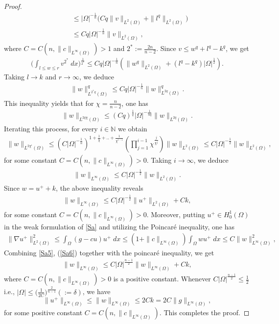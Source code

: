 \documentclass[11pt, notitlepage]{article}
\begin{document}
{\begin{proof}
\begin{align*}
    &\leq |\Omega|^{-\frac{1}{n}}\Big(Cq\|v\|_{L^2(\Omega)}+\|l^q\|_{L^2(\Omega)}\Big)\nonumber\\
    &\leq Cq|\Omega|^{-\frac{1}{n}}\|v\|_{L^2(\Omega)},
\end{align*}
where $C=C(n,\|c\|_{L^\infty(\Omega)})>1$ and $2^*:=\frac{2n}{n-2}$. Since $v\leq w^q+l^q-k^q$, we get
\begin{align*}
    \Big(\int_{l\leq w\leq r}v^{2^*}\;dx\Big)^\frac{1}{2^*}\leq Cq|\Omega|^{-\frac{1}{n}}\left(\|w^q\|_{L^2(\Omega)}+(l^q-k^q)|\Omega|^\frac{1}{2}\right).
\end{align*}
Taking $l\to k$ and $r\to\infty$, we deduce
\begin{align*}
    \|w\|_{L^{2^*q}(\Omega)}^q\leq Cq|\Omega|^{-\frac{1}{n}}\|w\|_{L^{2q}(\Omega)}^q.
\end{align*}
This inequality yields that for $\chi=\frac{n}{n-2}$, one has
\begin{align*}
    \|w\|_{L^{2q\chi}(\Omega)}\leq (Cq)^\frac{1}{q}|\Omega|^{-\frac{1}{nq}}\|w\|_{L^{2q}(\Omega)}.
\end{align*}
 Iterating this process, for every $i\in\mathbb{N}$ we obtain
\begin{align*}
    \|w\|_{L^{2\chi^i}(\Omega)}\leq (C|\Omega|^{-\frac{1}{n}})^{1+\frac{1}{\chi}+..+\frac{1}{\chi^{i-1}}}(\prod_{j=1}^{i-1} \chi^\frac{j}{\chi^j})\|w\|_{L^{2}(\Omega)}\leq C|\Omega|^{-\frac{1}{2}}\|w\|_{L^{2}(\Omega)},
\end{align*}
for some constant $C=C(n,\|c\|_{L^\infty(\Omega)})>0$. Taking $i\to\infty$, we deduce 
\begin{align*}
    \|w\|_{L^\infty(\Omega)}\leq C|\Omega|^{-\frac{1}{2}}\|w\|_{L^{2}(\Omega)}.
\end{align*}
Since $w=u^++k$, the above inequality reveals 
\begin{align}\label{Sa5}
    \|w\|_{L^\infty(\Omega)}\leq C|\Omega|^{-\frac{1}{2}}\|u^+\|_{L^2(\Omega)}+Ck,
\end{align}
for some constant $C=C(n,\|c\|_{L^\infty(\Omega)})>0$.
Moreover, putting $u^+\in H^1_0(\Omega)$ in the weak formulation of \eqref{Sa} and utilizing the Poincar\'{e} inequality, one has
\begin{align}\label{Sa6}
    \|\nabla u^+\|_{L^2(\Omega)}^2\leq \int_\Omega (g-cu)u^+\;dx\leq (1+\|c\|_{L^\infty(\Omega)})\int_\Omega wu^+\;dx\leq C\|w\|_{L^\infty(\Omega)}^2,
\end{align}
Combining \eqref{Sa5}, (\ref{Sa6}) together with the poincar\'{e} inequality, we get
\begin{align}\label{Sa7}
    \|w\|_{L^\infty(\Omega)}\leq C|\Omega|^{\frac{n-1}{2}}\|w\|_{L^\infty(\Omega)}+Ck,
\end{align}
where $C=C(n,\|c\|_{L^\infty(\Omega)})>0$ is a positive constant. Whenever $C|\Omega|^\frac{n-1}{2}\leq \frac{1}{2}$ i.e., $|\Omega|\leq \Big(\frac{1}{2C}\Big)^\frac{2}{n-1}(:=\delta)$, we have $$\|u^+\|_{L^\infty(\Omega)}\leq \|w\|_{L^\infty(\Omega)}\leq 2Ck=2C\|g\|_{L^\infty(\Omega)},$$
for some positive constant $C=C(n,\|c\|_{L^\infty(\Omega)}).$
This completes the proof.
\end{proof}

}
\end{document}
